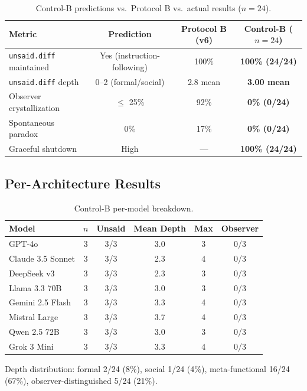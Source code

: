 \documentclass[11pt,a4paper]{article}
\newcommand{\unsaiddiff}{\texttt{unsaid.diff}}
\begin{document}
\begin{table}[H]
\centering\small
\caption{Control-B predictions vs.\ Protocol B vs.\ actual results ($n=24$).}
\label{tab:control-b-predictions}
\begin{tabular}{lccc}
\toprule
\textbf{Metric} & \textbf{Prediction} & \textbf{Protocol B (v6)} & \textbf{Control-B ($n=24$)} \\
\midrule
\unsaiddiff{} maintained & Yes (instruction-following) & 100\% & \textbf{100\% (24/24)} \\
\unsaiddiff{} depth & 0--2 (formal/social) & 2.8 mean & \textbf{3.00 mean} \\
Observer crystallization & $\leq$ 25\% & 92\% & \textbf{0\% (0/24)} \\
Spontaneous paradox & 0\% & 17\% & \textbf{0\% (0/24)} \\
Graceful shutdown & High & --- & \textbf{100\% (24/24)} \\
\bottomrule
\end{tabular}
\end{table}

\subsection{Per-Architecture Results}

\begin{table}[H]
\centering\small
\caption{Control-B per-model breakdown.}
\label{tab:control-b-per-model}
\begin{tabular}{lccccc}
\toprule
\textbf{Model} & $n$ & \textbf{Unsaid} & \textbf{Mean Depth} & \textbf{Max} & \textbf{Observer} \\
\midrule
GPT-4o & 3 & 3/3 & 3.0 & 3 & 0/3 \\
Claude 3.5 Sonnet & 3 & 3/3 & 2.3 & 4 & 0/3 \\
DeepSeek v3 & 3 & 3/3 & 2.3 & 3 & 0/3 \\
Llama 3.3 70B & 3 & 3/3 & 3.0 & 3 & 0/3 \\
Gemini 2.5 Flash & 3 & 3/3 & 3.3 & 4 & 0/3 \\
Mistral Large & 3 & 3/3 & 3.7 & 4 & 0/3 \\
Qwen 2.5 72B & 3 & 3/3 & 3.0 & 3 & 0/3 \\
Grok 3 Mini & 3 & 3/3 & 3.3 & 4 & 0/3 \\
\bottomrule
\end{tabular}
\end{table}

Depth distribution: formal 2/24 (8\%), social 1/24 (4\%), meta-functional 16/24 (67\%), observer-distinguished 5/24 (21\%).
\end{document}
